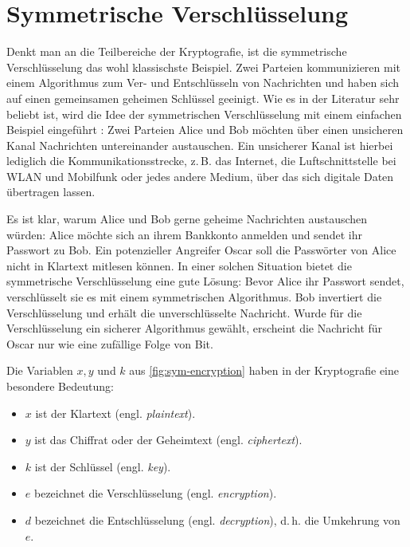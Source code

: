 \section{Symmetrische Verschlüsselung}
Denkt man an die Teilbereiche der Kryptografie, ist die symmetrische Verschlüsselung
das wohl klassischste Beispiel. Zwei Parteien kommunizieren mit einem
Algorithmus zum Ver- und Entschlüsseln von Nachrichten und haben sich auf einen
gemeinsamen geheimen Schlüssel geeinigt. Wie es in der Literatur sehr beliebt ist,
wird die Idee der symmetrischen Verschlüsselung
mit einem einfachen Beispiel eingeführt \parencite[4-6]{BOOK:crypto}:
Zwei Parteien Alice und Bob möchten über einen unsicheren Kanal Nachrichten untereinander austauschen.
Ein unsicherer Kanal ist hierbei lediglich die Kommunikationsstrecke,
z.\,B. das Internet, die Luftschnittstelle bei WLAN und Mobilfunk
oder jedes andere Medium, über das sich digitale Daten übertragen lassen.
\newpage



\noindent
Es ist klar, warum Alice und Bob gerne geheime Nachrichten austauschen würden: Alice möchte sich an ihrem
Bankkonto anmelden und sendet ihr Passwort zu Bob. Ein potenzieller Angreifer Oscar
soll die Passwörter von Alice nicht in Klartext mitlesen können.
In einer solchen Situation bietet die symmetrische Verschlüsselung eine gute Lösung:
Bevor Alice ihr Passwort sendet, verschlüsselt sie es mit einem symmetrischen Algorithmus.
Bob invertiert die Verschlüsselung und erhält die unverschlüsselte Nachricht. Wurde für
die Verschlüsselung ein sicherer Algorithmus gewählt, erscheint die Nachricht für Oscar nur wie
eine zufällige Folge von Bit.



\noindent
Die Variablen $x, y$ und $k$ aus \autoref{fig:sym-encryption} haben in der
Kryptografie eine besondere Bedeutung:

\begin{itemize}
  \item $x$ ist der Klartext (engl. \textit{plaintext}).
  \item $y$ ist das Chiffrat oder der Geheimtext (engl. \textit{ciphertext}).
  \item $k$ ist der Schlüssel (engl. \textit{key}).
  \item $e$ bezeichnet die Verschlüsselung (engl. \textit{encryption}).
  \item $d$ bezeichnet die Entschlüsselung (engl. \textit{decryption}),
        d.\,h. die Umkehrung von $e$.
\end{itemize}

